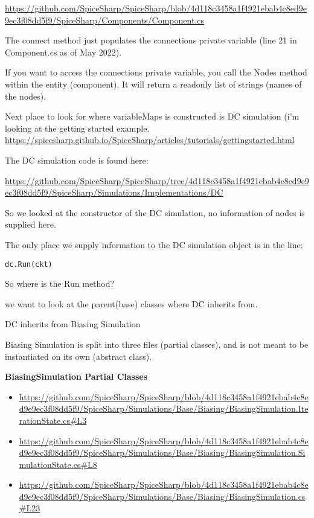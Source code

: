 \documentclass[12pt]{article}
\renewcommand{\_}{\kern-1.5pt\textunderscore\kern-1.5pt}
\begin{document}
\url{https://github.com/SpiceSharp/SpiceSharp/blob/4d118c3458a1f4921ebab4c8ed9e9ec3f08dd5f9/SpiceSharp/Components/Component.cs}

The connect method just populates the connections private variable (line 21 in Component.cs as of May 2022).

If you want to access the connections private variable, you call the Nodes method within the entity (component). It will return a readonly list of strings (names of the nodes).  

Next place to look for where variableMaps is constructed is DC simulation (i'm looking at the getting started example.
\url{https://spicesharp.github.io/SpiceSharp/articles/tutorials/gettingstarted.html}

The DC simulation code is found here:

\url{https://github.com/SpiceSharp/SpiceSharp/tree/4d118c3458a1f4921ebab4c8ed9e9ec3f08dd5f9/SpiceSharp/Simulations/Implementations/DC}

So we looked at the constructor of the DC simulation, no information of nodes is supplied here.

The only place we supply information to the DC simulation object is in the line:

\begin{verbatim}
dc.Run(ckt)
\end{verbatim}

So where is the Run method?

we want to look at the parent(base) classes where DC inherits from. 

DC inherits from Biasing Simulation

Biasing Simulation is split into three files (partial classes), and is not meant to be instantiated on its own (abstract class).

\textbf{BiasingSimulation Partial Classes}
\begin{itemize}
\item \url{https://github.com/SpiceSharp/SpiceSharp/blob/4d118c3458a1f4921ebab4c8ed9e9ec3f08dd5f9/SpiceSharp/Simulations/Base/Biasing/BiasingSimulation.IterationState.cs#L3}
\item \url{https://github.com/SpiceSharp/SpiceSharp/blob/4d118c3458a1f4921ebab4c8ed9e9ec3f08dd5f9/SpiceSharp/Simulations/Base/Biasing/BiasingSimulation.SimulationState.cs#L8}
\item \url{https://github.com/SpiceSharp/SpiceSharp/blob/4d118c3458a1f4921ebab4c8ed9e9ec3f08dd5f9/SpiceSharp/Simulations/Base/Biasing/BiasingSimulation.cs#L23}
\end{itemize}
\end{document}

